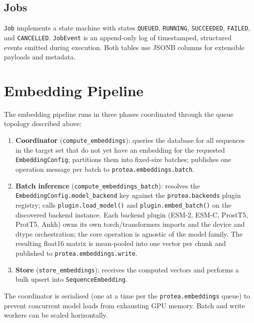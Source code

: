 \subsection{Jobs}
\label{subsec:dm-jobs}

\texttt{Job} implements a state machine with states \texttt{QUEUED},
\texttt{RUNNING}, \texttt{SUCCEEDED}, \texttt{FAILED}, and \texttt{CANCELLED}.
\texttt{JobEvent} is an append-only log of timestamped, structured events
emitted during execution. Both tables use JSONB columns for extensible payloads
and metadata.

\section{Embedding Pipeline}
\label{sec:embedding-pipeline}

The embedding pipeline runs in three phases coordinated through the queue
topology described above:

\begin{enumerate}
  \item \textbf{Coordinator} (\texttt{compute\_embeddings}): queries the database
    for all sequences in the target set that do not yet have an embedding for the
    requested \texttt{EmbeddingConfig}; partitions them into fixed-size batches;
    publishes one operation message per batch to \texttt{protea.embeddings.batch}.
  \item \textbf{Batch inference} (\texttt{compute\_embeddings\_batch}): resolves
    the \texttt{EmbeddingConfig.model\_backend} key against the
    \texttt{protea.backends} plugin registry; calls
    \texttt{plugin.load\_model()} and \texttt{plugin.embed\_batch()} on the
    discovered backend instance. Each backend plugin (ESM-2, ESM-C, ProstT5,
    ProtT5, Ankh) owns its own torch/transformers imports and the device and
    dtype orchestration; the core operation is agnostic of the model family.
    The resulting float16 matrix is mean-pooled into one vector per chunk and
    published to \texttt{protea.embeddings.write}.
  \item \textbf{Store} (\texttt{store\_embeddings}): receives the computed vectors
    and performs a bulk upsert into \texttt{SequenceEmbedding}.
\end{enumerate}

The coordinator is serialised (one at a time per the \texttt{protea.embeddings}
queue) to prevent concurrent model loads from exhausting GPU memory.
Batch and write workers can be scaled horizontally.

